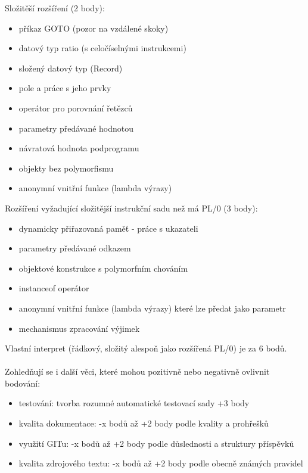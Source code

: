 \documentclass[czech, oth, kiv, he, iso690numb, viewonly]{fasthesis}
\begin{document}
    Složitěší rozšíření (2 body):
    \begin{itemize}
        \item příkaz GOTO (pozor na vzdálené skoky)
        \item datový typ ratio (s celočíselnými instrukcemi)
        \item složený datový typ (Record)
        \item pole a práce s jeho prvky
        \item operátor pro porovnání řetězců
        \item parametry předávané hodnotou
        \item návratová hodnota podprogramu
        \item objekty bez polymorfismu
        \item anonymní vnitřní funkce (lambda výrazy)
    \end{itemize}
    Rozšíření vyžadující složitější instrukční sadu než má PL/0 (3 body):
    \begin{itemize}
        \item dynamicky přiřazovaná paměť - práce s ukazateli
        \item parametry předávané odkazem
        \item objektové konstrukce s polymorfním chováním
        \item instanceof operátor
        \item anonymní vnitřní funkce (lambda výrazy) které lze předat jako parametr
        \item mechanismus zpracování výjimek
    \end{itemize}
    Vlastní interpret (řádkový, složitý alespoň jako rozšířená PL/0) je za 6 bodů. 
    \\\\
    Zohledňují se i další věci, které mohou pozitivně nebo negativně ovlivnit bodování:
    \begin{itemize}
        \item testování: tvorba rozumné automatické testovací sady +3 body
        \item kvalita dokumentace: -x bodů až +2 body podle kvality a prohřešků
        \item využití GITu: -x bodů až +2 body podle důslednosti a struktury příspěvků
        \item kvalita zdrojového textu: -x bodů až +2 body podle obecně známých pravidel
    \end{itemize}
\end{document}
